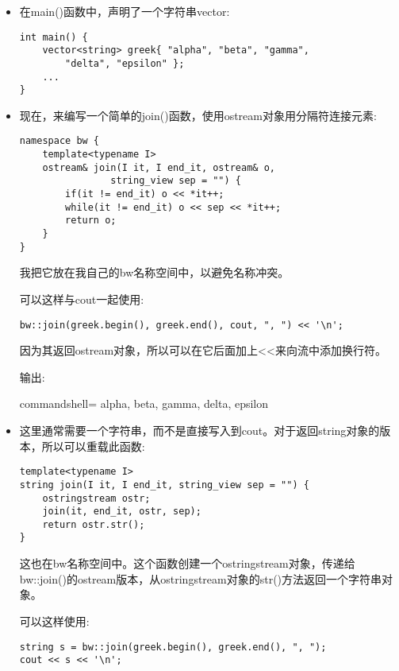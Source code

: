 \begin{itemize}
\item 
在main()函数中，声明了一个字符串vector:

\begin{lstlisting}[style=styleCXX]
int main() {
	vector<string> greek{ "alpha", "beta", "gamma",
		"delta", "epsilon" };
	...
}
\end{lstlisting}

\item 
现在，来编写一个简单的join()函数，使用ostream对象用分隔符连接元素:

\begin{lstlisting}[style=styleCXX]
namespace bw {
	template<typename I>
	ostream& join(I it, I end_it, ostream& o,
				string_view sep = "") {
		if(it != end_it) o << *it++;
		while(it != end_it) o << sep << *it++;
		return o;
	}
}
\end{lstlisting}

我把它放在我自己的bw名称空间中，以避免名称冲突。

可以这样与cout一起使用:

\begin{lstlisting}[style=styleCXX]
bw::join(greek.begin(), greek.end(), cout, ", ") << '\n';
\end{lstlisting}

因为其返回ostream对象，所以可以在它后面加上<{}<来向流中添加换行符。

输出:

\begin{tcblisting}{commandshell={}}
alpha, beta, gamma, delta, epsilon
\end{tcblisting}

\item 
这里通常需要一个字符串，而不是直接写入到cout。对于返回string对象的版本，所以可以重载此函数:

\begin{lstlisting}[style=styleCXX]
template<typename I>
string join(I it, I end_it, string_view sep = "") {
	ostringstream ostr;
	join(it, end_it, ostr, sep);
	return ostr.str();
}
\end{lstlisting}

这也在bw名称空间中。这个函数创建一个ostringstream对象，传递给bw::join()的ostream版本，从ostringstream对象的str()方法返回一个字符串对象。

可以这样使用:

\begin{lstlisting}[style=styleCXX]
string s = bw::join(greek.begin(), greek.end(), ", ");
cout << s << '\n';
\end{lstlisting}


\end{itemize}
